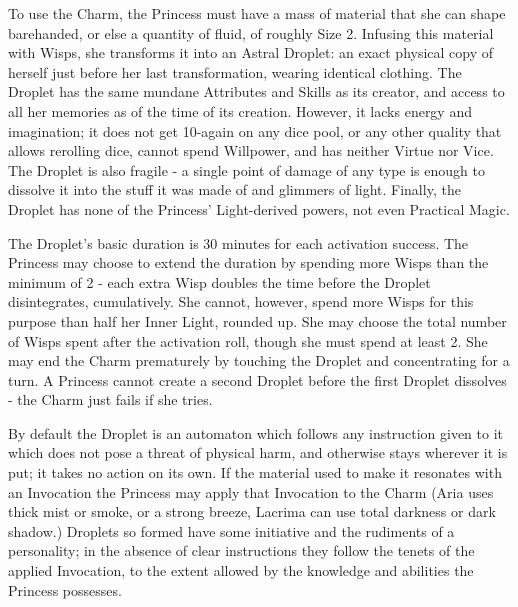 To use the Charm, the Princess must have a mass of material that she can shape barehanded, or else a quantity of fluid, of roughly Size 2. Infusing this material with Wisps, she transforms it into an Astral Droplet: an exact physical copy of herself just before her last transformation, wearing identical clothing. The Droplet has the same mundane Attributes and Skills as its creator, and access to all her memories as of the time of its creation. However, it lacks energy and imagination; it does not get 10-again on any dice pool, or any other quality that allows rerolling dice, cannot spend Willpower, and has neither Virtue nor Vice. The Droplet is also fragile - a single point of damage of any type is enough to dissolve it into the stuff it was made of and glimmers of light. Finally, the Droplet has none of the Princess' Light-derived powers, not even Practical Magic.

The Droplet's basic duration is 30 minutes for each activation success. The Princess may choose to extend the duration by spending more Wisps than the minimum of 2 - each extra Wisp doubles the time before the Droplet disintegrates, cumulatively. She cannot, however, spend more Wisps for this purpose than half her Inner Light, rounded up. She may choose the total number of Wisps spent after the activation roll, though she must spend at least 2. She may end the Charm prematurely by touching the Droplet and concentrating for a turn. A Princess cannot create a second Droplet before the first Droplet dissolves - the Charm just fails if she tries.

By default the Droplet is an automaton which follows any instruction given to it which does not pose a threat of physical harm, and otherwise stays wherever it is put; it takes no action on its own. If the material used to make it resonates with an Invocation the Princess may apply that Invocation to the Charm (Aria uses thick mist or smoke, or a strong breeze, Lacrima can use total darkness or dark shadow.) Droplets so formed have some initiative and the rudiments of a personality; in the absence of clear instructions they follow the tenets of the applied Invocation, to the extent allowed by the knowledge and abilities the Princess possesses.

